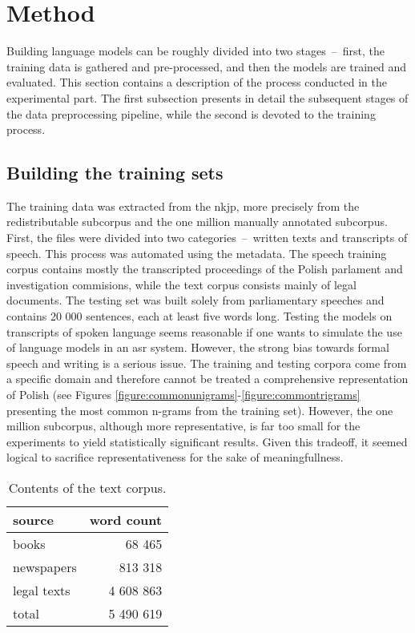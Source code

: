 \section{Method}
\label{section:method}
Building language models can be roughly divided into two stages~--~first, the training data is gathered and pre-processed, and then the models are trained and evaluated. This section contains a description of the process conducted in the experimental part. The first subsection presents in detail the subsequent stages of the data preprocessing pipeline, while the second is devoted to the training process.
\subsection{Building the training sets}
\label{subsection:trainingset}
The training data was extracted from the \gls{nkjp}, more precisely from the redistributable subcorpus and the one million manually annotated subcorpus. First, the files were divided into two categories~--~written texts and transcripts of speech. This process was automated using the metadata. The speech training corpus contains mostly the transcripted proceedings of the Polish parlament and investigation commisions, while the text corpus consists mainly of legal documents. The testing set was built solely from parliamentary speeches and contains 20 000 sentences, each at least five words long. Testing the models on transcripts of spoken language seems reasonable if one wants to simulate the use of language models in an \gls{asr} system. However, the strong bias towards formal speech and writing is a serious issue. The training and testing corpora come from a specific domain and therefore cannot be treated a comprehensive representation of Polish (see Figures \ref{figure:commonunigrams}-\ref{figure:commontrigrams} presenting the most common n-grams from the training set). However, the one million subcorpus, although more representative, is far too small for the experiments to yield statistically significant results. Given this tradeoff, it seemed logical to sacrifice representativeness for the sake of meaningfullness.

\begin{table}[!htbp]
	\centering
	\caption[Contents of the text corpus]{Contents of the text corpus.}
	\begin{tabular*}{.6\linewidth}{@{\extracolsep{\fill}}lr}
		source & word count \\
		\midrule
                books & 68 465 \\
                newspapers & 813 318 \\
                legal texts & 4 608 863 \\
                total  & 5 490 619 \\
	\end{tabular*}
\end{table}

